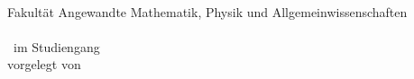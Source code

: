 \thispagestyle{empty}
\begin{titlepage}
	\vspace*{-1cm}
	
	\begin{center}
		\\[1.5cm]
		
		{\LARGE Fakultät Angewandte Mathematik, Physik und Allgemeinwissenschaften}\\[1.5cm]
		
		{\huge\bfseries \titel}\\[1.5cm]
		
		{\Large \artderarbeit~im Studiengang \studiengang}\\[2cm]
		
		{\large vorgelegt von}\\[0.3cm]
		{\Large \autor}
	\end{center}
	
\end{titlepage}
